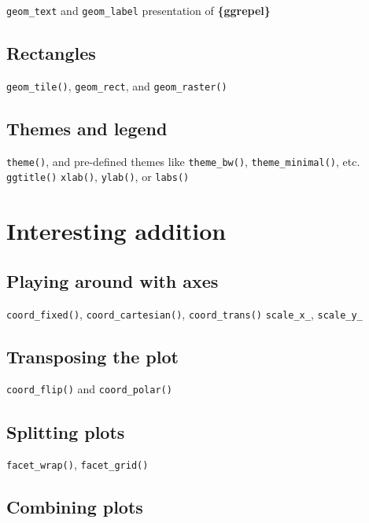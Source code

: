 \documentclass[
]{book}
\begin{document}
\texttt{geom\_text} and \texttt{geom\_label}
presentation of \textbf{\{ggrepel\}}

\hypertarget{rectangles}{%
\subsection{Rectangles}\label{rectangles}}

\texttt{geom\_tile()}, \texttt{geom\_rect}, and \texttt{geom\_raster()}

\hypertarget{themes-and-legend}{%
\subsection{Themes and legend}\label{themes-and-legend}}

\texttt{theme()}, and pre-defined themes like \texttt{theme\_bw()}, \texttt{theme\_minimal()}, etc.
\texttt{ggtitle()}
\texttt{xlab()}, \texttt{ylab()}, or \texttt{labs()}

\hypertarget{interesting-addition}{%
\section{Interesting addition}\label{interesting-addition}}

\hypertarget{playing-around-with-axes}{%
\subsection{Playing around with axes}\label{playing-around-with-axes}}

\texttt{coord\_fixed()}, \texttt{coord\_cartesian()}, \texttt{coord\_trans()}
\texttt{scale\_x\_}, \texttt{scale\_y\_}

\hypertarget{transposing-the-plot}{%
\subsection{Transposing the plot}\label{transposing-the-plot}}

\texttt{coord\_flip()} and \texttt{coord\_polar()}

\hypertarget{splitting-plots}{%
\subsection{Splitting plots}\label{splitting-plots}}

\texttt{facet\_wrap()}, \texttt{facet\_grid()}

\hypertarget{combining-plots}{%
\subsection{Combining plots}\label{combining-plots}}
\end{document}
